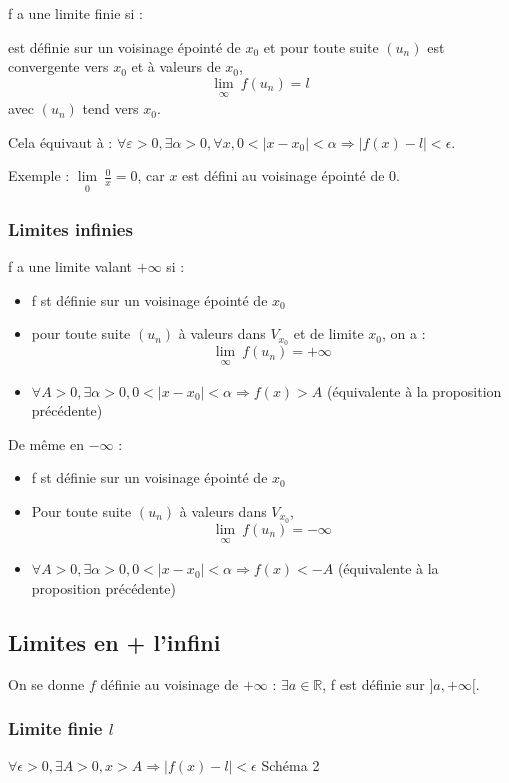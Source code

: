 \documentclass[french]{yLectureNote}
\newcommand{\Lim}[1]{\lim\limits_{\substack{#1}}\:}
\begin{document}
f a une limite finie si :

est définie sur un voisinage épointé de $x_0$ et pour toute suite $(u_n)$ est convergente vers $x_0$ et à valeurs de $x_0$, \[\Lim{\infty} f(u_n) = l\] avec $(u_n)$ tend vers $x_0$.

Cela équivaut à : $\forall \varepsilon >0, \exists \alpha >0, \forall x, 0< |x-x_0|<\alpha \Rightarrow |f(x) - l|<\epsilon$.

 Exemple : $\Lim{0}\frac{0}{x} = 0$, car $x$ est défini au voisinage épointé de 0.
\subsubsection{Limites infinies}

 f a une limite valant $+\infty$ si :
 \begin{itemize}
  \item f st définie sur un voisinage épointé de $x_0$

 \item pour toute suite $(u_n)$ à valeurs dans $V_{x_0}$ et de limite $x_0$, on a : \[\Lim{\infty} f(u_n) = +\infty\]

 \item $\forall A >0, \exists \alpha >0, 0<|x-x_0|<\alpha \Rightarrow f(x)>A$ (équivalente à la proposition précédente)
 \end{itemize}

 De m\^eme en $-\infty$ :

 \begin{itemize}
 \item f st définie sur un voisinage épointé de $x_0$
  \item Pour toute suite $(u_n)$ à valeurs dans $V_{x_0}$, \[\Lim{\infty} f(u_n) = -\infty\]

 \item $\forall A >0, \exists \alpha >0, 0<|x-x_0|<\alpha \Rightarrow f(x)<-A$ (équivalente à la proposition précédente)
 \end{itemize}
\subsection{Limites en + l'infini}
On se donne $f$ définie au voisinage de $+\infty$ : $\exists a\in\mathbb{R}$, f est définie sur $]a,+\infty[$.
\subsubsection{Limite finie $l$}
$\forall \epsilon >0, \exists A>0, x>A \Rightarrow |f(x)-l|<\epsilon$ Schéma 2
\end{document}
